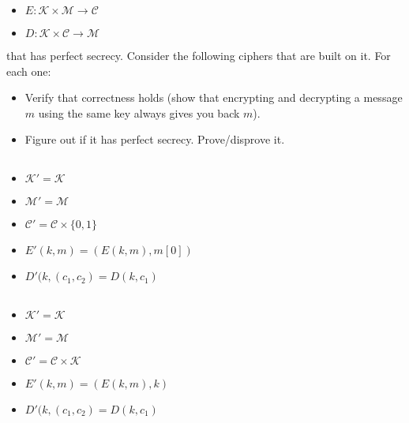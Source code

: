 \documentclass[12pt]{article}
\begin{document}
\begin{itemize}
\item $E : \mathcal{K} \times \mathcal{M} \to \mathcal{C}$
\item $D : \mathcal{K} \times \mathcal{C} \to \mathcal{M}$
\end{itemize}

that has perfect secrecy. Consider the following ciphers that are built on it. For each one:

\begin{itemize}
\item Verify that correctness holds (show that encrypting and decrypting a message $m$ using the same key always gives you back $m$).
\item Figure out if it has perfect secrecy. Prove/disprove it.
\end{itemize}



\subsection{}

\begin{itemize}
\item $\mathcal{K'} = \mathcal{K}$
\item $\mathcal{M'} = \mathcal{M}$
\item $\mathcal{C'} = \mathcal{C} \times \{0, 1\}$
\item $E'(k, m) = (E(k, m), m[0])$
\item $D'(k, (c_1, c_2) = D(k, c_1)$
\end{itemize}


\subsection{}

\begin{itemize}
\item $\mathcal{K'} = \mathcal{K}$
\item $\mathcal{M'} = \mathcal{M}$
\item $\mathcal{C'} = \mathcal{C} \times \mathcal{K}$
\item $E'(k, m) = (E(k, m), k)$
\item $D'(k, (c_1, c_2) = D(k, c_1)$
\end{itemize}

\end{document}
